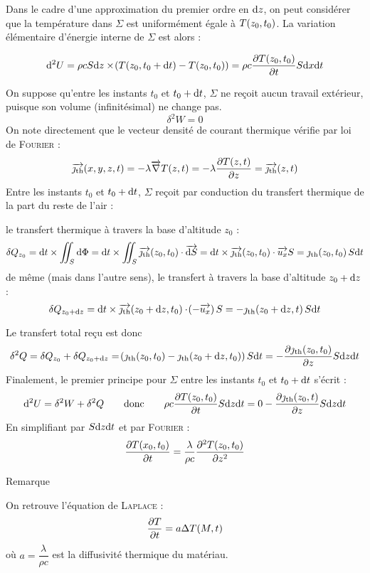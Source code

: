 \documentclass[a4paper,french,bookmarks]{article}
\begin{document}
    Dans le cadre d'une approximation du premier ordre en $\mathrm d z$, on peut considérer que la température dans $\Sigma$ est uniformément égale à $T\!\left(z_0, t_0\right)$.  La variation élémentaire d'énergie interne de $\Sigma$ est alors :

    \[ \mathrm d^2 U = \rho c S \mathrm d z \times \!\left(T\!\left(z_0, t_0 + \mathrm d t\right) - T\!\left(z_0, t_0\right)\right) = \rho c \dfrac{\partial T\!\left(z_0, t_0\right)}{\partial t}S \mathrm d x \mathrm d t\]

    On suppose qu'entre les instants $t_0$ et $t_0+ \mathrm d t$, $\Sigma$ ne reçoit aucun travail extérieur, puisque son volume (infinitésimal) ne change pas.
    \[ \delta^2 W = 0\]
    On note directement que le vecteur densité de courant thermique vérifie par loi de \textsc{Fourier} :
    \[ \overrightarrow{\jmath_\text{th}}\!\left(x, y, z, t\right) = -\lambda \overrightarrow{\nabla} T\!\left(z, t\right) = -\lambda \dfrac{\partial T\!\left(z, t\right)}{\partial z} = \overrightarrow{\jmath_\text{th}}\!\left(z, t\right)\]
    Entre les instants $t_0$ et $t_0+ \mathrm d t$, $\Sigma$ reçoit par conduction du transfert thermique de la part du reste de l'air :
    \begin{enumerate}
        \itt le transfert thermique à travers la base d'altitude $z_0$ :
        \[ \delta Q_{z_0} = \dif t \times \niint_S \dif \Phi  = \dif t \times \niint_S \vec{\jmath_\text{th}}\p{z_0, t_0}\cdot \vec{\dif S} = \dif t \times \vec{\jmath_\text{th}}\p{z_0, t_0}\cdot \vec{u_x} S = \jmath_\text{th}\p{z_0, t_0}S\dif t  \]
        \itt de même (mais dans l'autre sens), le transfert à travers la base d'altitude $z_0 + \mathrm d z$ :
        \[ \delta Q_{z_0 + \mathrm d z} = \mathrm d t \times \overrightarrow{\jmath_\text{th}}\!\left(z_0 + \mathrm d z, t_0\right)\cdot \!\left(-\overrightarrow{u_x}\right) S = -\jmath_\text{th}\!\left(z_0 + \mathrm d z, t\right)S\mathrm d t\]
    \end{enumerate}
    Le transfert total reçu est donc 
    \[ \delta^2 Q =  \delta Q_{z_0} +  \delta Q_{z_0 + \mathrm d z} = \!\left(\jmath_\text{th}\!\left(z_0, t_0\right) - \jmath_\text{th}\!\left(z_0 + \mathrm d z, t_0\right)\right)S \mathrm d t = -\dfrac{\partial \jmath_\text{th}\!\left(z_0, t_0\right)}{\partial z}S\mathrm d z\mathrm d t\]
    Finalement, le premier principe pour $\Sigma$ entre les instants $t_0$ et $t_0 +\mathrm d t$ s'écrit :
    \[ \mathrm d^2 U = \delta^2 W + \delta^2 Q \qquad\text{donc}\qquad \rho c \dfrac{\partial T\!\left(z_0, t_0\right)}{\partial t}S\mathrm d z\mathrm d t = 0 - \dfrac{\partial \jmath_\text{th}\!\left(z_0, t\right)}{\partial z}S\mathrm d z\mathrm d t\]
    En simplifiant par $S \mathrm d z \mathrm d t$ et par \textsc{Fourier} :
    \[ \dfrac{\partial T\!\left(x_0, t_0\right)}{\partial t} = \dfrac{\lambda}{\rho c}\dfrac{\partial^2 T\!\left(z_0, t_0\right)}{\partial z^2}\]
    \begin{form}{Remarque}{}
        \begin{enumerate}
        \ithand On retrouve l'équation de \textsc{Laplace} :
        \[ \dfrac{\partial T}{\partial t} = a\Delta T\!\left(M, t\right) \]
        où $a = \dfrac{\lambda}{\rho c}$ est la diffusivité thermique du matériau.
    \end{enumerate}
    \end{form}
    
\end{document}
